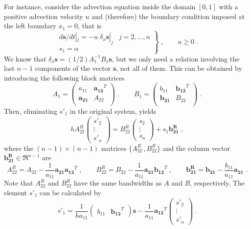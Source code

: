 {For instance, consider the advection equation inside the domain $[0,1]$ with a
positive advection velocity $u$ and (therefore) the boundary condition imposed
at the left boundary $x_1=0$, that is
\begin{equation}
  \left.\begin{array}{ll}
      d\mathbf{s}/dt|_j = -u\; \delta_x \mathbf{s}|_j & j=2,\ldots,n\\
      s_1=\alpha
    \end{array}\right\} \;,\qquad u\ge 0  \;.
\label{equ:problem2}
\end{equation}
We know that $\delta_x \mathbf{s} = (1/2)A_1^{-1}B_1\mathbf{s}$, but we only
need a relation involving the last $n-1$ components of the vector $\mathbf{s}$,
not all of them. This can be obtained by introducing the following block
matrices \citep{Lomax:1998,Mellado:2012}
\begin{equation*}
A_1=
\left(\begin{array}{cc}a_{11}&\mathbf{a_{12}}^T \\\mathbf{a_{21}}   &A_{22}\\
\end{array}\right) \;, \qquad
B_1=
\left(\begin{array}{cc}b_{11}&\mathbf{b_{12}}^T \\\mathbf{b_{21}}   &B_{22}\\
\end{array}\right) \;.
\end{equation*}
Then, eliminating $s'_1$ in the original system, yields
\begin{equation}
hA^R_{22}
\left(\begin{array}{c}s'_2\\\vdots\\s'_n\end{array}\right) =
B^R_{22}\left(\begin{array}{c}s_2\\\vdots\\s_n\end{array}\right)+
s_1\mathbf{b^R_{21}} \;,
\end{equation}
where the $(n-1)\times (n-1)$ matrices $\{A^R_{22}\,,B^R_{22}\}$ and the column
vector $\mathbf{b^R_{21}}\in\Re^{n-1}$ are
\begin{equation}
A^R_{22}=A_{22}-\frac{1}{a_{11}}\mathbf{a_{21}}\mathbf{a_{12}}^T \;,\qquad
B^R_{22}=B_{22}-\frac{1}{a_{11}}\mathbf{a_{21}}\mathbf{b_{12}}^T \;,\qquad
\mathbf{b^R_{21}}=\mathbf{b_{21}}-\frac{b_{11}}{a_{11}}\mathbf{a_{21}} \;.
\end{equation}
Note that $A^R_{22}$ and $B^R_{22}$ have the same bandwidths as $A$ and $B$,
respectively. The element $s'_1$ can be calculated by
\begin{equation}
s'_1=\frac{1}{ha_{11}} 
\left(\begin{array}{cc}b_{11}\!&\!\mathbf{b_{12}}^T\end{array}\right)
\mathbf{s} - \frac{1}{a_{11}}
\mathbf{a_{12}}^T \left(\begin{array}{c}s'_2\\\vdots\\s'_n\end{array}\right)\;.
\end{equation}


}
